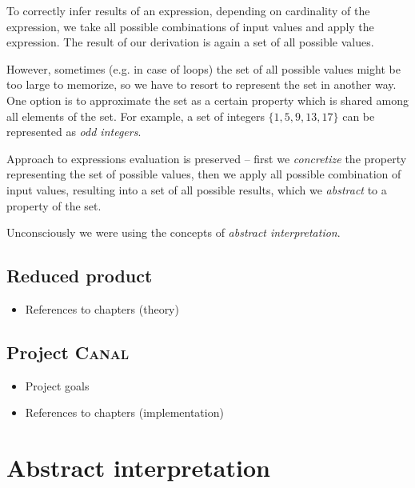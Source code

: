 \documentclass[12pt,oneside]{fithesis2}
\theoremstyle{definition}
\begin{document}
To correctly infer results of an expression, depending on cardinality of the expression, we take all possible combinations of input values and apply the expression. The result of our derivation is again a set of all possible values.

However, sometimes (e.g. in case of loops) the set of all possible values might be too large to memorize, so we have to resort to represent the set in another way. One option is to approximate the set as a certain property which is shared among all elements of the set. For example, a set of integers $\{1, 5, 9, 13, 17\}$ can be represented as \textit{odd integers}.

Approach to expressions evaluation is preserved -- first we \textit{concretize} the property representing the set of possible values, then we apply all possible combination of input values, resulting into a set of all possible results, which we \textit{abstract} to a property of the set.

Unconsciously we were using the concepts of \textit{abstract interpretation}.

\section{Reduced product}
\begin{itemize}
  \item References to chapters (theory)
\end{itemize}

\section{Project \textsc{Canal}}
\begin{itemize}
  \item Project goals
  \item References to chapters (implementation)
\end{itemize}


\chapter{Abstract interpretation}\label{ch:abstract-interpretation}
\end{document}
